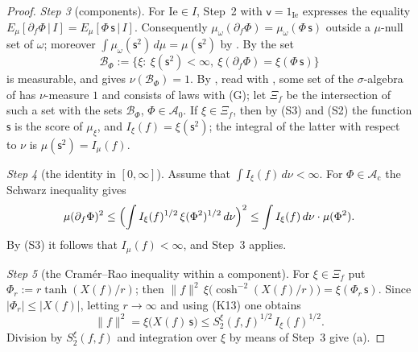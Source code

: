 \documentclass[11pt,letterpaper,reqno]{amsart}
\theoremstyle{definition}
\begin{document}
\begin{proof}
\emph{Step 3} (components).
For $\mathrm{Ie}\in I$, Step~2 with $\mathsf v=1_{\mathrm{Ie}}$ expresses the equality $E_\mu[\partial_f\Phi\,|\,I]=E_\mu[\Phi\,\mathsf s\,|\,I]$.
Consequently $\mu_\omega(\partial_f\Phi)=\mu_\omega(\Phi\,\mathsf s)$ outside a $\mu$-null set of $\omega$;
moreover $\int\mu_\omega(\mathsf s^2)\,d\mu=\mu(\mathsf s^2)$ by \cite[Proposition~45.6\,(a$'$)]{QEDIII}.
By \cite[Proposition~45.6\,(d0)]{QEDIII} the set
\begin{equation*}
\mathcal B_\Phi:=\{\xi:\ \xi(\mathsf s^2)<\infty,\ \xi(\partial_f\Phi)=\xi(\Phi\,\mathsf s)\}
\end{equation*}
is measurable, and \cite[Proposition~45.6\,(a$''$)]{QEDIII} gives $\nu(\mathcal B_\Phi)=1$.
By \cite[Proposition~45.6\,(c)]{QEDIII}, read with \cite[(n7)]{QEDIII}, some set of the $\sigma$-algebra of \cite[(n7)]{QEDIII} has $\nu$-measure $1$ and consists of laws with (G);
let $\Xi_f$ be the intersection of such a set with the sets $\mathcal B_\Phi$, $\Phi\in\mathcal A_0$.
If $\xi\in\Xi_f$, then by (S3) and (S2) the function $\mathsf s$ is the score of $\mu_\xi$, and $I_\xi(f)=\xi(\mathsf s^2)$;
the integral of the latter with respect to $\nu$ is $\mu(\mathsf s^2)=I_\mu(f)$.

\emph{Step 4} (the identity in $[0,\infty]$).
Assume that $\int I_\xi(f)\,d\nu<\infty$.
For $\Phi\in\mathcal A_{\mathrm c}$ the Schwarz inequality gives
\begin{equation*}
\mu(\partial_f\Phi)^2\le\Bigl(\int I_\xi(f)^{1/2}\,\xi(\Phi^2)^{1/2}\,d\nu\Bigr)^2\le\int I_\xi(f)\,d\nu\cdot\mu(\Phi^2).
\end{equation*}
By (S3) it follows that $I_\mu(f)<\infty$, and Step~3 applies.

\emph{Step 5} (the Cram\'er--Rao inequality within a component).
For $\xi\in\Xi_f$ put $\Phi_r:=r\tanh(X(f)/r)$;
then $\|f\|^2\,\allowbreak \xi\bigl(\cosh^{-2}(X(f)/r)\bigr)=\allowbreak \xi(\Phi_r\,\allowbreak \mathsf s)$.
Since $|\Phi_r|\le|X(f)|$, letting $r\to\infty$ and using (K13) one obtains
\begin{equation*}
\|f\|^2=\xi\bigl(X(f)\,\mathsf s\bigr)\le S_2^\xi(f,f)^{1/2}\,I_\xi(f)^{1/2}.
\end{equation*}
Division by $S_2^\xi(f,f)$ and integration over $\xi$ by means of Step~3 give (a).


\end{proof}
\end{document}
